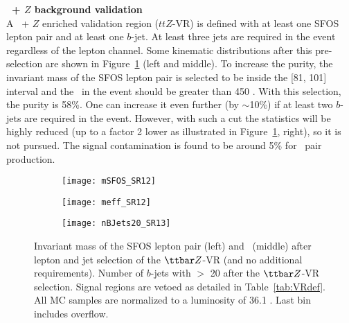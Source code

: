 \par{\bf \ttbar\ + $Z$ background validation\\}
A \ttbar\ + $Z$ enriched validation region ($ttZ$-VR) is defined with at least one SFOS lepton pair and at least one $b$-jet. At least three jets are required in the event regardless of the lepton channel. Some kinematic distributions after this pre-selection are shown in Figure~\ref{fig:ttZ_VR_afterLepJetSel} (left and middle). To increase the purity, the invariant mass of the SFOS lepton pair is selected to be inside the [81, 101]~ \GeV interval and the \meff\ in the event should be greater than 450 \GeV. With this selection, the purity is 58\%. One can increase it even further (by $\sim$10\%) if at least two $b$-jets are required in the event. However, with such a cut the statistics will be highly reduced (up to a factor 2 lower as illustrated in Figure~\ref{fig:ttZ_VR_afterLepJetSel}, right), so it is not pursued. The signal contamination is found to be around 5\% for \sbsb\ pair production.

\begin{figure}[t!]
\centering
\begin{subfigure}[t]{0.32\textwidth}
\texttt{[image: mSFOS\_SR12]}
\end{subfigure}
\begin{subfigure}[t]{0.32\textwidth}
\texttt{[image: meff\_SR12]}
\end{subfigure}
\begin{subfigure}[t]{0.32\textwidth}
\texttt{[image: nBJets20\_SR13]}
\end{subfigure}
\caption{Invariant mass of the SFOS lepton pair (left) and \meff\ (middle) after lepton and jet selection of the $\ttbar Z$-VR (and no additional requirements). Number of $b$-jets with \pt $>$ 20 \GeV after the $\ttbar Z$-VR selection. Signal regions are vetoed as detailed in Table~\ref{tab:VRdef}. All MC samples are normalized to a luminosity of 36.1 \ifb. Last bin includes overflow.
}
\label{fig:ttZ_VR_afterLepJetSel}
\end{figure} 


